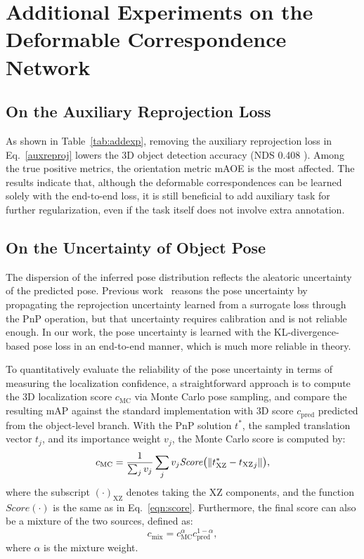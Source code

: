 \documentclass[10pt,twocolumn,letterpaper]{article}
\let\originalleft\left
\let\originalright\right
\renewcommand{\left}{\mathopen{}\mathclose\bgroup\originalleft}
\renewcommand{\right}{\aftergroup\egroup\originalright}
\begin{document}
\section{Additional Experiments on the Deformable Correspondence Network}

\subsection{On the Auxiliary Reprojection Loss}
As shown in Table~\ref{tab:addexp}, removing the auxiliary reprojection loss in Eq.~\ref{auxreproj} lowers the 3D object detection accuracy (NDS 0.408 ). Among the true positive metrics, the orientation metric mAOE is the most affected. The results indicate that, although the deformable correspondences can be learned solely with the end-to-end loss, it is still beneficial to add auxiliary task for further regularization, even if the task itself does not involve extra annotation.

\subsection{On the Uncertainty of Object Pose}
\label{uncertainpose}
The dispersion of the inferred pose distribution reflects the aleatoric uncertainty of the predicted pose. Previous work~\cite{monorun} reasons the pose uncertainty by propagating the reprojection uncertainty learned from a surrogate loss through the PnP operation, but that uncertainty requires calibration and is not reliable enough. In our work, the pose uncertainty is learned with the KL-divergence-based pose loss in an end-to-end manner, which is much more reliable in theory. 

To quantitatively evaluate the reliability of the pose uncertainty in terms of measuring the localization confidence, a straightforward approach is to compute the 3D localization score $c_\text{MC}$ via Monte Carlo pose sampling, and compare the resulting mAP against the standard implementation with 3D score $c_\text{pred}$ predicted from the object-level branch. With the PnP solution $t^\ast$, the sampled translation vector $t_j$, and its importance weight $v_j$, the Monte Carlo score is computed by:
\begin{equation}
    c_\text{MC} = \frac{1}{\sum_j v_j} \sum_j v_j \mathit{Score}\left(\|t^\ast_\text{XZ} - {t_\text{XZ}}_j\|\right),
\end{equation}
where the subscript $(\cdot)_\text{XZ}$ denotes taking the XZ components, and the function $\mathit{Score}(\cdot)$ is the same as in Eq.~\ref{eqn:score}. Furthermore, the final score can also be a mixture of the two sources, defined as:
\begin{equation}
    c_\text{mix} = c_\text{MC}^\alpha c_\text{pred}^{1-\alpha},
\end{equation}
where $\alpha$ is the mixture weight.
\end{document}
